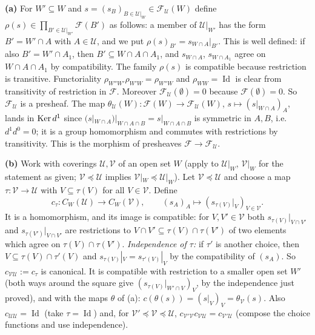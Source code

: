 \documentclass[11pt]{article}
\begin{document}
\textbf{(a)} For $W'\subseteq W$ and $s=(s_B)_{B\in\mathcal U|_W}\in\mathcal F_{\mathcal U}(W)$ define $\rho(s)\in\prod_{B'\in\mathcal U|_{W'}}\mathcal F(B')$ as follows: a member of $\mathcal U|_{W'}$ has the form $B'=W'\cap A$ with $A\in\mathcal U$, and we put $\rho(s)_{B'}=s_{W\cap A}|_{B'}$. This is well defined: if also $B'=W'\cap A_1$, then $B'\subseteq W\cap A\cap A_1$, and $s_{W\cap A}$, $s_{W\cap A_1}$ agree on $W\cap A\cap A_1$ by compatibility. The family $\rho(s)$ is compatible because restriction is transitive. Functoriality $\rho_{W''W'}\rho_{W'W}=\rho_{W''W}$ and $\rho_{WW}=\operatorname{Id}$ is clear from transitivity of restriction in $\mathcal F$. Moreover $\mathcal F_{\mathcal U}(\emptyset)=0$ because $\mathcal F(\emptyset)=0$. So $\mathcal F_{\mathcal U}$ is a presheaf. The map $\theta_{\mathcal U}(W):\mathcal F(W)\to\mathcal F_{\mathcal U}(W)$, $s\mapsto(s|_{W\cap A})_A$, lands in $\operatorname{Ker} d^1$ since $(s|_{W\cap A})|_{W\cap A\cap B}=s|_{W\cap A\cap B}$ is symmetric in $A,B$, i.e.\ $d^1d^0=0$; it is a group homomorphism and commutes with restrictions by transitivity. This is the morphism of presheaves $\mathcal F\to\mathcal F_{\mathcal U}$.

\textbf{(b)} Work with coverings $\mathcal U,\mathcal V$ of an open set $W$ (apply to $\mathcal U|_W$, $\mathcal V|_W$ for the statement as given; $\mathcal V\preceq\mathcal U$ implies $\mathcal V|_W\preceq\mathcal U|_W$). Let $\mathcal V\preceq\mathcal U$ and choose a map $\tau:\mathcal V\to\mathcal U$ with $V\subseteq\tau(V)$ for all $V\in\mathcal V$. Define
\[ c_\tau:C_W(\mathcal U)\to C_W(\mathcal V),\qquad (s_A)_A\mapsto(s_{\tau(V)}|_V)_{V\in\mathcal V}. \]
It is a homomorphism, and its image is compatible: for $V,V'\in\mathcal V$ both $s_{\tau(V)}|_{V\cap V'}$ and $s_{\tau(V')}|_{V\cap V'}$ are restrictions to $V\cap V'\subseteq\tau(V)\cap\tau(V')$ of two elements which agree on $\tau(V)\cap\tau(V')$. \emph{Independence of $\tau$:} if $\tau'$ is another choice, then $V\subseteq\tau(V)\cap\tau'(V)$ and $s_{\tau(V)}|_V=s_{\tau'(V)}|_V$ by the compatibility of $(s_A)$. So $c_{\mathcal V\mathcal U}:=c_\tau$ is canonical. It is compatible with restriction to a smaller open set $W'$ (both ways around the square give $(s_{\tau(V)}|_{W'\cap V})_V$, by the independence just proved), and with the maps $\theta$ of (a): $c(\theta(s))=(s|_{V})_V=\theta_{\mathcal V}(s)$. Also $c_{\mathcal U\mathcal U}=\operatorname{Id}$ (take $\tau=\operatorname{Id}$) and, for $\mathcal V'\preceq\mathcal V\preceq\mathcal U$, $c_{\mathcal V'\mathcal V}c_{\mathcal V\mathcal U}=c_{\mathcal V'\mathcal U}$ (compose the choice functions and use independence).
\end{document}
